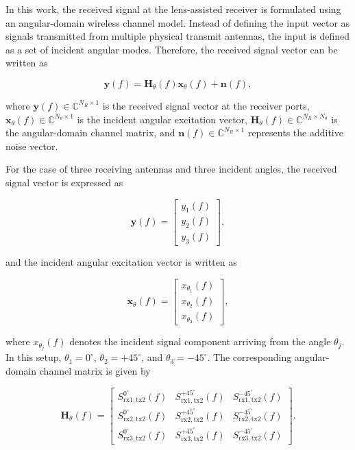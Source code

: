\documentclass[10pt]{article}
\begin{document}
In this work, the received signal at the lens-assisted receiver is formulated using an angular-domain wireless channel model. 
Instead of defining the input vector as signals transmitted from multiple physical transmit antennas, the input is defined as a set of incident angular modes. 
Therefore, the received signal vector can be written as

\begin{equation}
\mathbf{y}(f) = \mathbf{H}_{\theta}(f)\mathbf{x}_{\theta}(f) + \mathbf{n}(f),
\label{eq:angular_channel_model}
\end{equation}

where \(\mathbf{y}(f)\in\mathbb{C}^{N_R \times 1}\) is the received signal vector at the receiver ports, 
\(\mathbf{x}_{\theta}(f)\in\mathbb{C}^{N_{\theta}\times 1}\) is the incident angular excitation vector, 
\(\mathbf{H}_{\theta}(f)\in\mathbb{C}^{N_R \times N_{\theta}}\) is the angular-domain channel matrix, 
and \(\mathbf{n}(f)\in\mathbb{C}^{N_R \times 1}\) represents the additive noise vector.

For the case of three receiving antennas and three incident angles, the received signal vector is expressed as

\begin{equation}
\mathbf{y}(f)=
\begin{bmatrix}
y_1(f)\\
y_2(f)\\
y_3(f)
\end{bmatrix},
\end{equation}

and the incident angular excitation vector is written as

\begin{equation}
\mathbf{x}_{\theta}(f)=
\begin{bmatrix}
x_{\theta_1}(f)\\
x_{\theta_2}(f)\\
x_{\theta_3}(f)
\end{bmatrix},
\end{equation}

where \(x_{\theta_j}(f)\) denotes the incident signal component arriving from the angle \(\theta_j\). 
In this setup, \(\theta_1=0^\circ\), \(\theta_2=+45^\circ\), and \(\theta_3=-45^\circ\).
The corresponding angular-domain channel matrix is given by

\begin{equation}
\mathbf{H}_{\theta}(f)=
\begin{bmatrix}
S_{\mathrm{rx1},\mathrm{tx2}}^{0^\circ}(f) &
S_{\mathrm{rx1},\mathrm{tx2}}^{+45^\circ}(f) &
S_{\mathrm{rx1},\mathrm{tx2}}^{-45^\circ}(f)\\
S_{\mathrm{rx2},\mathrm{tx2}}^{0^\circ}(f) &
S_{\mathrm{rx2},\mathrm{tx2}}^{+45^\circ}(f) &
S_{\mathrm{rx2},\mathrm{tx2}}^{-45^\circ}(f)\\
S_{\mathrm{rx3},\mathrm{tx2}}^{0^\circ}(f) &
S_{\mathrm{rx3},\mathrm{tx2}}^{+45^\circ}(f) &
S_{\mathrm{rx3},\mathrm{tx2}}^{-45^\circ}(f)
\end{bmatrix}.
\label{eq:angular_channel_matrix}
\end{equation}
\end{document}

